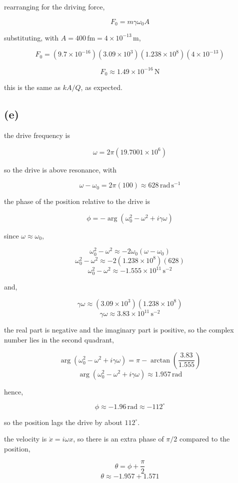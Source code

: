\documentclass{article}
\begin{document}
rearranging for the driving force,

\[
F_0=m\gamma\omega_0A
\]

substituting, with $A=400\,\mathrm{fm}=4\times10^{-13}\,\mathrm{m}$,

\[
F_0=(9.7\times10^{-16})(3.09\times10^{3})(1.238\times10^{8})(4\times10^{-13})
\]

\[
\boxed{F_0\approx1.49\times10^{-16}\,\mathrm{N}}
\]

this is the same as $kA/Q$, as expected.

\subsection*{(e)}

the drive frequency is

\[
\omega=2\pi(19.7001\times10^{6})
\]

so the drive is above resonance, with

\[
\omega-\omega_0=2\pi(100)\approx628\,\mathrm{rad\,s^{-1}}
\]

the phase of the position relative to the drive is

\[
\phi=-\arg\left(\omega_0^2-\omega^2+i\gamma\omega\right)
\]

since $\omega\approx\omega_0$,

\[
\omega_0^2-\omega^2\approx-2\omega_0(\omega-\omega_0)
\]
\[
\omega_0^2-\omega^2\approx-2(1.238\times10^{8})(628)
\]
\[
\omega_0^2-\omega^2\approx-1.555\times10^{11}\,\mathrm{s^{-2}}
\]

and,

\[
\gamma\omega\approx(3.09\times10^{3})(1.238\times10^{8})
\]
\[
\gamma\omega\approx3.83\times10^{11}\,\mathrm{s^{-2}}
\]

the real part is negative and the imaginary part is positive, so the complex number lies in the second quadrant,

\[
\arg\left(\omega_0^2-\omega^2+i\gamma\omega\right)=\pi-\arctan\left(\frac{3.83}{1.555}\right)
\]
\[
\arg\left(\omega_0^2-\omega^2+i\gamma\omega\right)\approx1.957\,\mathrm{rad}
\]

hence,

\[
\boxed{\phi\approx-1.96\,\mathrm{rad}\approx-112^\circ}
\]

so the position lags the drive by about $112^\circ$.

the velocity is $\dot{x}=i\omega x$, so there is an extra phase of $\pi/2$ compared to the position,

\[
\theta=\phi+\frac{\pi}{2}
\]
\[
\theta\approx-1.957+1.571
\]
\end{document}
